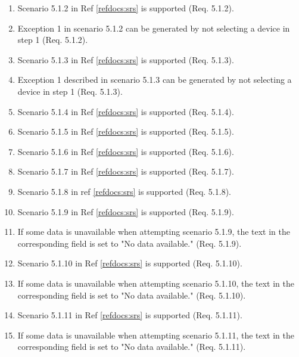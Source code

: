 \documentclass[a4paper]{article}
\newlength{\testlabellength}
\newenvironment{testlist}{\begin{enumerate}[label=\bfseries Instruction \thesubsection.\arabic* , labelindent=0pt, labelwidth=\testlabellength , leftmargin=2cm]}{\end{enumerate}}
\begin{document}
\begin{appendices}
\begin{testlist}
	\item Scenario 5.1.2 in Ref \ref{refdocs:srs} is supported (Req. 5.1.2).
	
	\item Exception 1 in scenario 5.1.2 can be generated by not selecting a device in step 1 (Req. 5.1.2).
	
	\item Scenario 5.1.3 in Ref \ref{refdocs:srs} is supported (Req. 5.1.3).
	
	\item Exception 1 described in scenario 5.1.3 can be generated by not selecting a device in step 1 (Req. 5.1.3). 
	
	\item Scenario 5.1.4 in Ref \ref{refdocs:srs} is supported (Req. 5.1.4).
	
	\item Scenario 5.1.5 in Ref \ref{refdocs:srs} is supported (Req. 5.1.5).
	
	\item Scenario 5.1.6 in Ref \ref{refdocs:srs} is supported (Req. 5.1.6).
	
	\item Scenario 5.1.7 in Ref \ref{refdocs:srs} is supported (Req. 5.1.7).
	
	\item Scenario 5.1.8 in ref \ref{refdocs:srs} is supported (Req. 5.1.8).

	\item Scenario 5.1.9 in Ref \ref{refdocs:srs} is supported (Req. 5.1.9).
	
	\item If some data is unavailable when attempting scenario 5.1.9, the text in the corresponding field is set to "No data available." (Req. 5.1.9).
	
	\item Scenario 5.1.10 in Ref \ref{refdocs:srs} is supported (Req. 5.1.10).
	
	\item If some data is unavailable when attempting scenario 5.1.10, the text in the corresponding field is set to "No data available." (Req. 5.1.10).
	
	\item Scenario 5.1.11 in Ref \ref{refdocs:srs} is supported (Req. 5.1.11).
	
	\item If some data is unavailable when attempting scenario 5.1.11, the text in the corresponding field is set to "No data available." (Req. 5.1.11).
	

\end{testlist}
\end{appendices}
\end{document}
